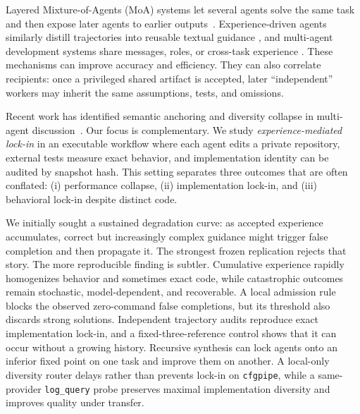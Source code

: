 \documentclass[letterpaper]{article}
\begin{document}
Layered Mixture-of-Agents (MoA) systems let several agents solve the same task and
then expose later agents to earlier outputs~\citep{wang2024moa}. Experience-driven
agents similarly distill trajectories into reusable textual guidance
\citep{zhao2024expel,shinn2023reflexion}, and multi-agent development systems share
messages, roles, or cross-task experience
\citep{qian2024chatdev,qian2024colearning,li2025mael_full}. These mechanisms can
improve accuracy and efficiency. They can also correlate recipients: once a
privileged shared artifact is accepted, later ``independent'' workers may inherit
the same assumptions, tests, and omissions.

Recent work has identified semantic anchoring and diversity collapse in
multi-agent discussion~\citep{guo2026diversitycollapse,zhang2026semanticcollapse}.
Our focus is complementary. We study \emph{experience-mediated lock-in} in an
executable workflow where each agent edits a private repository, external tests
measure exact behavior, and implementation identity can be audited by snapshot
hash. This setting separates three outcomes that are often conflated:
(i) performance collapse, (ii) implementation lock-in, and (iii) behavioral
lock-in despite distinct code.

We initially sought a sustained degradation curve: as accepted experience
accumulates, correct but increasingly complex guidance might trigger false
completion and then propagate it. The strongest frozen replication rejects that
story. The more reproducible finding is subtler. Cumulative experience rapidly
homogenizes behavior and sometimes exact code, while catastrophic outcomes remain
stochastic, model-dependent, and recoverable. A local admission rule blocks the
observed zero-command false completions, but its threshold also discards strong
solutions. Independent trajectory audits reproduce exact implementation lock-in,
and a fixed-three-reference control shows that it can occur without a growing
history. Recursive synthesis can lock agents onto an inferior fixed point on one
task and improve them on another. A local-only diversity router delays rather
than prevents lock-in on \texttt{cfgpipe}, while a same-provider
\texttt{log\_query} probe preserves maximal implementation diversity and improves
quality under transfer.
\end{document}
